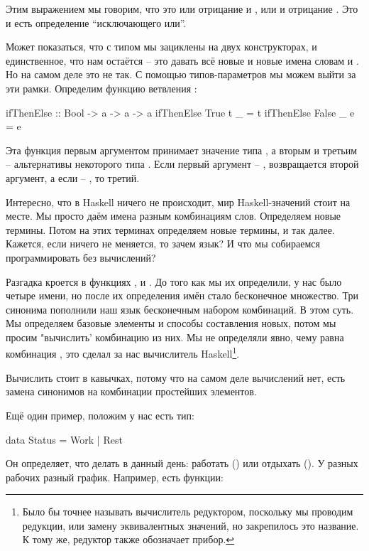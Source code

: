 Этим выражением мы говорим, что  это или отрицание  и
, или  и отрицание . Это и есть определение
``исключающего или''.

Может показаться, что с типом  мы зациклены на двух
конструкторах, и единственное, что нам остаётся -- это давать всё новые
и новые имена словам  и . Но на самом деле это не
так. С помощью типов-параметров мы можем выйти за эти рамки. Определим
функцию ветвления :


\begin{code}
ifThenElse :: Bool -> a -> a -> a
ifThenElse True   t  _ = t
ifThenElse False  _  e = e
\end{code}

Эта функция первым аргументом принимает значение типа , а
вторым и третьим -- альтернативы некоторого типа . Если первый
аргумент -- , возвращается второй аргумент, а если --
, то третий.

Интересно, что в Haskell ничего не происходит, мир Haskell-значений
стоит на месте. Мы просто даём имена разным комбинациям слов. Определяем
новые термины. Потом на этих терминах определяем новые термины, и так
далее. Кажется, если ничего не меняется, то зачем язык? И что мы
собираемся программировать без вычислений?

Разгадка кроется в функциях ,  и . До того как мы
их определили, у нас было четыре имени, но после их определения имён
стало бесконечное множество. Три синонима пополнили наш язык бесконечным
набором комбинаций. В этом суть. Мы определяем базовые элементы и
способы составления новых, потом мы просим "вычислить' комбинацию из
них. Мы не определяли явно, чему равна комбинация
, это сделал за нас вычислитель
Haskell\footnote{Было бы точнее называть вычислитель редуктором,
  поскольку мы проводим редукции, или замену эквивалентных значений, но
  закрепилось это название. К тому же, редуктор также обозначает прибор.}.

Вычислить стоит в кавычках, потому что на самом деле вычислений нет,
есть замена синонимов на комбинации простейших элементов.

Ещё один пример, положим у нас есть тип:


\begin{code}
data Status = Work | Rest
\end{code}

Он определяет, что делать в данный день: работать () или
отдыхать (). У разных рабочих разный график. Например, есть
функции:


